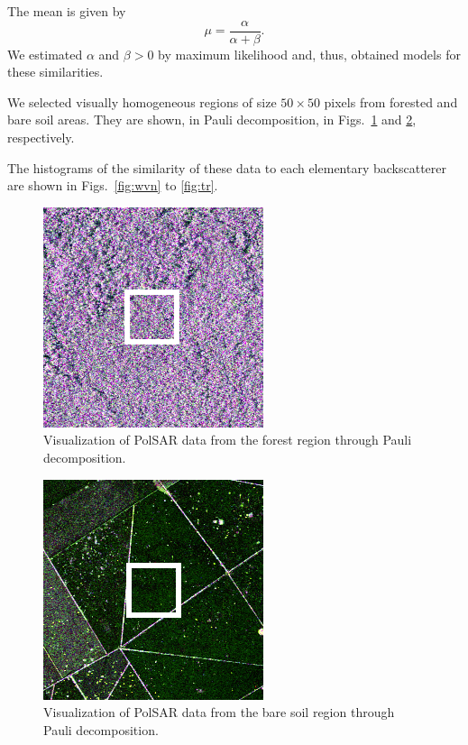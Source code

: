 \documentclass[conference]{IEEEtran}
\begin{document}
The mean is given by
\begin{equation}
  \mu = \frac{\alpha}{\alpha + \beta}.
  \label{eq:MeanBeta}
\end{equation}
We estimated $\alpha$ and $\beta>0$ by maximum likelihood and, thus, obtained models for these similarities.

We selected visually homogeneous regions of size $50\times50$ pixels from forested and bare soil areas.
They are shown, in Pauli decomposition, in Figs.~\ref{fig:forest} and \ref{fig:bare_soil}, respectively.



The histograms of the similarity of these data to each elementary backscatterer are shown in Figs.~\ref{fig:wvn} to \ref{fig:tr}.


\begin{figure}[hbt]
    \vspace{.1\linewidth}
    \centering
    \includegraphics[width = .7\linewidth]{forest}
    \caption{Visualization of PolSAR data from the forest region through Pauli decomposition.}
    \label{fig:forest}
\end{figure}

\begin{figure}[hbt]
    \vspace{.1\linewidth}
    \centering
    \includegraphics[width = .7\linewidth]{bare_soil.png}
    \caption{Visualization of PolSAR data from the bare soil region through Pauli decomposition.}
    \label{fig:bare_soil}
\end{figure}
\end{document}
